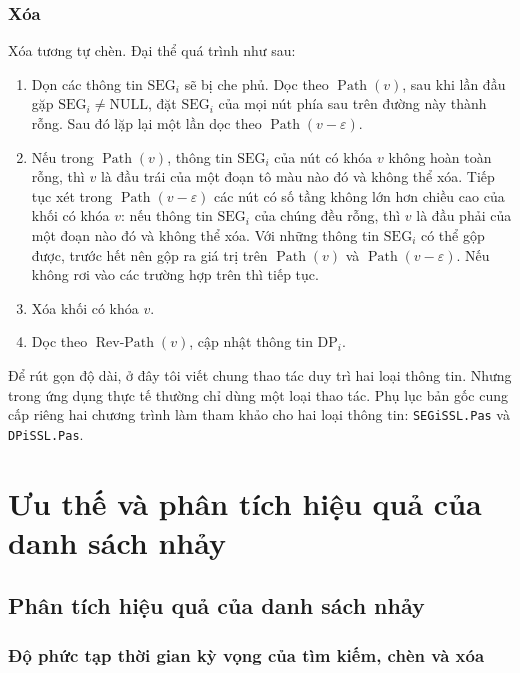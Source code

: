 \documentclass[11pt]{article}
\newcommand{\Path}{\operatorname{Path}}
\newcommand{\RevPath}{\operatorname{Rev\mbox{-}Path}}
\newcommand{\DPi}{\mathrm{DP}_i}
\newcommand{\SEGi}{\mathrm{SEG}_i}
\begin{document}
\subsubsection*{Xóa}

Xóa tương tự chèn. Đại thể quá trình như sau:

\begin{enumerate}
  \item Dọn các thông tin $\SEGi$ sẽ bị che phủ. Dọc theo $\Path(v)$, sau khi
  lần đầu gặp $\SEGi\ne \mathrm{NULL}$, đặt $\SEGi$ của mọi nút phía sau trên
  đường này thành rỗng. Sau đó lặp lại một lần dọc theo
  $\Path(v-\varepsilon)$.

  \item Nếu trong $\Path(v)$, thông tin $\SEGi$ của nút có khóa $v$ không hoàn
  toàn rỗng, thì $v$ là đầu trái của một đoạn tô màu nào đó và không thể xóa.
  Tiếp tục xét trong $\Path(v-\varepsilon)$ các nút có số tầng không lớn hơn
  chiều cao của khối có khóa $v$: nếu thông tin $\SEGi$ của chúng đều rỗng,
  thì $v$ là đầu phải của một đoạn nào đó và không thể xóa. Với những thông
  tin $\SEGi$ có thể gộp được, trước hết nên gộp ra giá trị trên $\Path(v)$ và
  $\Path(v-\varepsilon)$. Nếu không rơi vào các trường hợp trên thì tiếp tục.

  \item Xóa khối có khóa $v$.

  \item Dọc theo $\RevPath(v)$, cập nhật thông tin $\DPi$.
\end{enumerate}

Để rút gọn độ dài, ở đây tôi viết chung thao tác duy trì hai loại thông tin.
Nhưng trong ứng dụng thực tế thường chỉ dùng một loại thao tác. Phụ lục bản
gốc cung cấp riêng hai chương trình làm tham khảo cho hai loại thông tin:
\texttt{SEGiSSL.Pas} và \texttt{DPiSSL.Pas}.

\section{Ưu thế và phân tích hiệu quả của danh sách nhảy}

\subsection{Phân tích hiệu quả của danh sách nhảy}

\subsubsection*{Độ phức tạp thời gian kỳ vọng của tìm kiếm, chèn và xóa}
\end{document}

